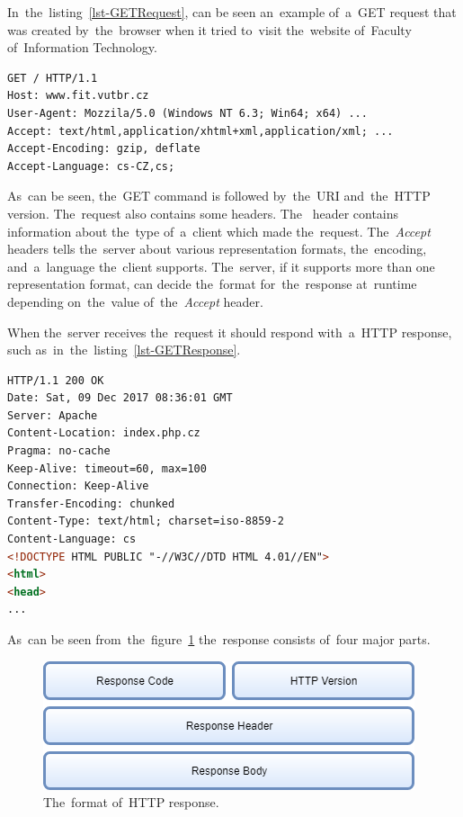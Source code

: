 In~the~listing~\ref{lst-GETRequest}, can be seen an~example of~a~GET request
that was created by~the~browser when it tried to~visit the~website of~Faculty
of~Information Technology.

\vspace{1.5mm}
\begin{lstlisting}[caption=An~example of~a~simplified GET request made
by~the~browser., label=lst-GETRequest, language=HTML]
GET / HTTP/1.1
Host: www.fit.vutbr.cz
User-Agent: Mozzila/5.0 (Windows NT 6.3; Win64; x64) ...
Accept: text/html,application/xhtml+xml,application/xml; ...
Accept-Encoding: gzip, deflate
Accept-Language: cs-CZ,cs;
\end{lstlisting}

As~can be seen, the~GET command is followed by~the~URI and~the~HTTP version.
The~request also contains some headers. The~ header contains
information about the~type of~a~client which made the~request.
The~\textit{Accept} headers tells the~server about various representation
formats, the~encoding, and~a~language the~client supports. The~server, if it
supports more than one representation format, can decide the~format
for~the~response at~runtime depending on~the~value of~the~\textit{Accept}
header. 

When the~server receives the~request it should respond with~a~HTTP response,
such as~in~the~listing~\ref{lst-GETResponse}.

\vspace{1.5mm}
\begin{lstlisting}[caption=An~example of~a~simplified response to~GET
request., label=lst-GETResponse, language=HTML]
HTTP/1.1 200 OK
Date: Sat, 09 Dec 2017 08:36:01 GMT
Server: Apache
Content-Location: index.php.cz
Pragma: no-cache
Keep-Alive: timeout=60, max=100
Connection: Keep-Alive
Transfer-Encoding: chunked
Content-Type: text/html; charset=iso-8859-2
Content-Language: cs
<!DOCTYPE HTML PUBLIC "-//W3C//DTD HTML 4.01//EN">
<html>
<head>
...
\end{lstlisting}

As~can be seen from~the~figure~\ref{fig-HTTPResponse} the~response consists
of~four major parts.

\begin{figure}[!hbt]
	\centering
	\includegraphics[scale=0.5]{./figures/http-response.png}
	\caption{The~format of~HTTP response.}
	\label{fig-HTTPResponse}
\end{figure}

